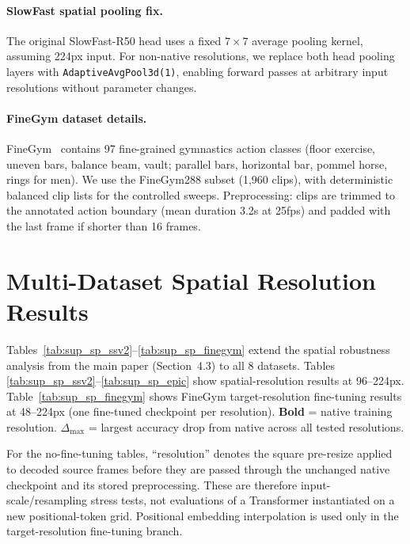 \documentclass[runningheads]{llncs}
\newcommand{\rev}[1]{\textcolor{revblue}{#1}}
\begin{document}
\paragraph{SlowFast spatial pooling fix.}
The original SlowFast-R50 head uses a fixed $7\times7$ average pooling kernel, assuming 224px input. For non-native resolutions, we replace both head pooling layers with \texttt{AdaptiveAvgPool3d(1)}, enabling forward passes at arbitrary input resolutions without parameter changes.

\paragraph{FineGym dataset details.}
FineGym~\cite{shao2020finegym} contains 97 fine-grained gymnastics action classes (floor exercise, uneven bars, balance beam, vault; parallel bars, horizontal bar, pommel horse, rings for men). We use the FineGym288 subset (1,960 clips), with deterministic balanced clip lists for the controlled sweeps. Preprocessing: clips are trimmed to the annotated action boundary (mean duration 3.2s at 25fps) and padded with the last frame if shorter than 16 frames.

\section{Multi-Dataset Spatial Resolution Results}
\label{sec:sup_spatial}

Tables~\ref{tab:sup_sp_ssv2}--\ref{tab:sup_sp_finegym} extend the spatial robustness analysis from the main paper (Section~4.3) to all 8 datasets. Tables \ref{tab:sup_sp_ssv2}--\ref{tab:sup_sp_epic} show spatial-resolution results at 96--224px. Table~\ref{tab:sup_sp_finegym} shows FineGym target-resolution fine-tuning results at 48--224px (one fine-tuned checkpoint per resolution). \textbf{Bold} = native training resolution. $\Delta_\text{max}$ = largest accuracy drop from native across all tested resolutions.

\rev{For the no-fine-tuning tables, ``resolution'' denotes the square pre-resize applied to decoded source frames before they are passed through the unchanged native checkpoint and its stored preprocessing. These are therefore input-scale/resampling stress tests, not evaluations of a Transformer instantiated on a new positional-token grid. Positional embedding interpolation is used only in the target-resolution fine-tuning branch.}
\end{document}
